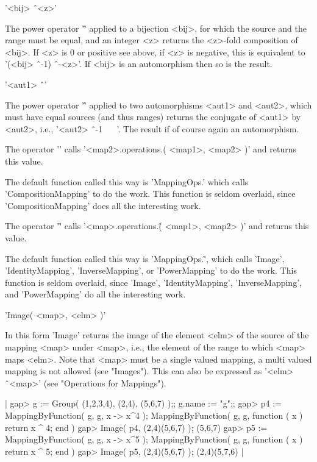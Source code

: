 '<bij> \^\ <z>'

The  power  operator '\^'  applied to a  bijection  <bij>, for  which the
source and  the  range  must  be equal, and  an integer  <z>  returns the
<z>-fold composition of <bij>.  If <z> is 0 or positive see above, if <z>
is negative, this is  equivalent to '(<bij> \^\ -1) \^\ -<z>'.  If  <bij>
is an automorphism then so is  the result.

'<aut1> \^\ <aut2>'

The power operator '\^' applied to  two  automorphisms <aut1> and <aut2>,
which must have equal sources (and thus ranges)  returns the conjugate of
<aut1> by  <aut2>, i.e.,  '<aut2> \^\ -1  \*\ <aut1>  \*\  <aut2>'.   The
result if of course again an automorphism.

The operator  '\*'  calls '<map2>.operations.\*(   <map1>, <map2>  )' and
returns this value.

The  default function called  this  way is  'MappingOps.\*'  which  calls
'CompositionMapping' to  do  the work.  This function is seldom overlaid,
since 'CompositionMapping' does all the interesting work.

The  operator  '\^' calls  '<map>.operations.\^(  <map1>,  <map2>  )' and
returns this value.

The  default  function  called this  way is  'MappingOps.\^', which calls
'Image', 'IdentityMapping', 'InverseMapping', or 'PowerMapping' to do the
work.     This   function    is   seldom    overlaid,   since    'Image',
'IdentityMapping',  'InverseMapping',   and  'PowerMapping'  do  all  the
interesting work.


'Image( <map>, <elm> )'

In this form 'Image' returns the image of the element <elm> of the source
of the mapping <map> under <map>, i.e., the element of the range to which
<map>  maps <elm>.   Note  that  <map> must be a single valued mapping, a
multi  valued  mapping is not  allowed (see  "Images").  This can also be
expressed as '<elm> \^\ <map>' (see "Operations for Mappings").

|    gap> g := Group( (1,2,3,4), (2,4), (5,6,7) );;  g.name := "g";;
    gap> p4 := MappingByFunction( g, g, x -> x^4 );
    MappingByFunction( g, g, function ( x )
        return x ^ 4;
    end )
    gap> Image( p4, (2,4)(5,6,7) );
    (5,6,7)
    gap> p5 := MappingByFunction( g, g, x -> x^5 );
    MappingByFunction( g, g, function ( x )
        return x ^ 5;
    end )
    gap> Image( p5, (2,4)(5,6,7) );
    (2,4)(5,7,6) |

